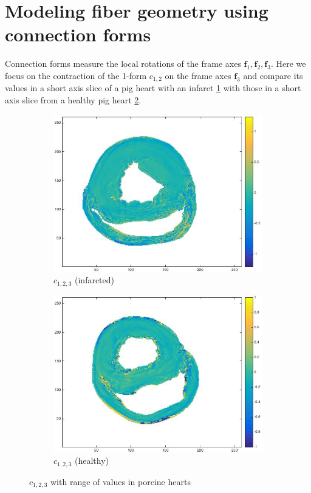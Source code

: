 \section{Modeling fiber geometry using connection forms}

Connection forms measure the local rotations of the frame axes $\mathbf{f}_1, \mathbf{f}_2, \mathbf{f}_3$. Here we focus on the contraction of the 1-form $c_{1,2}$ on the frame axes $\mathbf{f}_3$ and compare its values in a short axis slice of a pig heart with an infarct \ref{fig:c123infarcted} with those in a short axis slice from a healthy pig heart \ref{fig:c123healthy}.
\begin{figure}[h!]
    \centering
    \begin{subfigure}[h!]{0.48\textwidth}
        \centering
        \includegraphics[width=\textwidth]{figures/pig4_c123_slice_19}
        \caption{$c_{1,2,3}$ (infarcted)}
        \label{fig:c123infarcted}
    \end{subfigure}
    \hfill
    \begin{subfigure}[h!]{0.48\textwidth}
        \centering
        \includegraphics[width=\textwidth]{figures/pig25_c123_slice_30}
        \caption{$c_{1,2,3}$ (healthy)}
        \label{fig:c123healthy}
    \end{subfigure}
    \caption{$c_{1,2,3}$ with range of values in porcine hearts}
    \label{fig:c123all}
\end{figure}

